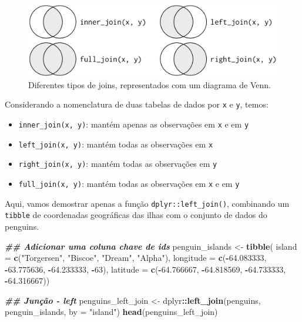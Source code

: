 \documentclass[
]{article}
\newenvironment{Shaded}{\begin{snugshade}}{\end{snugshade}}
\newcommand{\AttributeTok}[1]{\textcolor[rgb]{0.13,0.29,0.53}{#1}}
\newcommand{\DecValTok}[1]{\textcolor[rgb]{0.00,0.00,0.81}{#1}}
\newcommand{\DocumentationTok}[1]{\textcolor[rgb]{0.56,0.35,0.01}{\textbf{\textit{#1}}}}
\newcommand{\FloatTok}[1]{\textcolor[rgb]{0.00,0.00,0.81}{#1}}
\newcommand{\FunctionTok}[1]{\textcolor[rgb]{0.13,0.29,0.53}{\textbf{#1}}}
\newcommand{\NormalTok}[1]{#1}
\newcommand{\OtherTok}[1]{\textcolor[rgb]{0.56,0.35,0.01}{#1}}
\newcommand{\SpecialCharTok}[1]{\textcolor[rgb]{0.81,0.36,0.00}{\textbf{#1}}}
\newcommand{\StringTok}[1]{\textcolor[rgb]{0.31,0.60,0.02}{#1}}
\providecommand{\tightlist}{%
  \setlength{\itemsep}{0pt}\setlength{\parskip}{0pt}}
\begin{document}
\begin{figure}

{\centering \includegraphics[width=15.31in]{figures/cap05_fig03} 

}

\caption{Diferentes tipos de joins, representados com um diagrama de Venn.}\label{fig:fig-r-join}
\end{figure}

Considerando a nomenclatura de duas tabelas de dados por \texttt{x} e \texttt{y}, temos:

\begin{itemize}
\tightlist
\item
  \texttt{inner\_join(x,\ y)}: mantém apenas as observações em \texttt{x} e em \texttt{y}
\item
  \texttt{left\_join(x,\ y)}: mantém todas as observações em \texttt{x}
\item
  \texttt{right\_join(x,\ y)}: mantém todas as observações em \texttt{y}
\item
  \texttt{full\_join(x,\ y)}: mantém todas as observações em \texttt{x} e em \texttt{y}
\end{itemize}

Aqui, vamos demostrar apenas a função \texttt{dplyr::left\_join()}, combinando um \texttt{tibble} de coordenadas geográficas das ilhas com o conjunto de dados do penguins.

\begin{Shaded}
\begin{Highlighting}[]
\DocumentationTok{\#\# Adicionar uma coluna chave de ids}
\NormalTok{penguin\_islands }\OtherTok{\textless{}{-}} \FunctionTok{tibble}\NormalTok{(}
    \AttributeTok{island =} \FunctionTok{c}\NormalTok{(}\StringTok{"Torgersen"}\NormalTok{, }\StringTok{"Biscoe"}\NormalTok{, }\StringTok{"Dream"}\NormalTok{, }\StringTok{"Alpha"}\NormalTok{),}
    \AttributeTok{longitude =} \FunctionTok{c}\NormalTok{(}\SpecialCharTok{{-}}\FloatTok{64.083333}\NormalTok{, }\SpecialCharTok{{-}}\FloatTok{63.775636}\NormalTok{, }\SpecialCharTok{{-}}\FloatTok{64.233333}\NormalTok{, }\SpecialCharTok{{-}}\DecValTok{63}\NormalTok{),}
    \AttributeTok{latitude =} \FunctionTok{c}\NormalTok{(}\SpecialCharTok{{-}}\FloatTok{64.766667}\NormalTok{, }\SpecialCharTok{{-}}\FloatTok{64.818569}\NormalTok{, }\SpecialCharTok{{-}}\FloatTok{64.733333}\NormalTok{, }\SpecialCharTok{{-}}\FloatTok{64.316667}\NormalTok{))}

\DocumentationTok{\#\# Junção {-} left}
\NormalTok{penguins\_left\_join }\OtherTok{\textless{}{-}}\NormalTok{ dplyr}\SpecialCharTok{::}\FunctionTok{left\_join}\NormalTok{(penguins, penguin\_islands, }\AttributeTok{by =} \StringTok{"island"}\NormalTok{)}
\FunctionTok{head}\NormalTok{(penguins\_left\_join)}
\end{Highlighting}
\end{Shaded}
\end{document}
